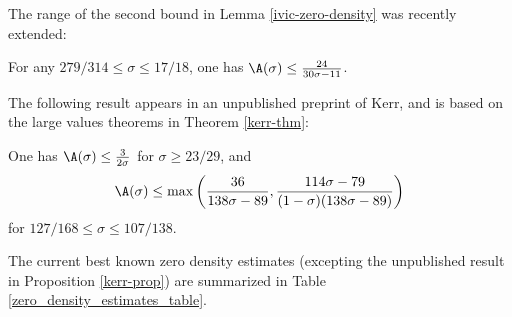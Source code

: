 The range of the second bound in Lemma \ref{ivic-zero-density} was recently extended:

\begin{theorem}\label{cdv-density}\cite{chen_debruyne_vindas_density_2024}  For any $279/314 \leq \sigma \leq 17/18$, one has $\A(\sigma) \leq \frac{24}{30\sigma-11}$.
\end{theorem}
\literature
{}

The following result appears in an unpublished preprint of Kerr, and is based on the large values theorems in Theorem \ref{kerr-thm}:

\begin{proposition}\label{kerr-prop}\cite[Theorems 6, 7]{kerr} One has $\A(\sigma) \leq \frac{3}{2\sigma}$ for $\sigma \geq 23/29$, and
$$\A(\sigma) \leq \max\left( \frac{36}{138\sigma-89}, \frac{114\sigma-79}{(1-\sigma)(138\sigma-89)} \right)$$
for $127/168 \leq \sigma \leq 107/138$.
\end{proposition}

The current best known zero density estimates (excepting the unpublished result in Proposition \ref{kerr-prop}) are summarized in Table \ref{zero_density_estimates_table}.

\derived
{}

